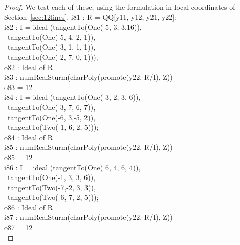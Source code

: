 \begin{proof}
We test each of these, using the formulation in local coordinates of
Section~\ref{sec:12lines}. 
%
\beginOutput
i81 : R = QQ[y11, y12, y21, y22];\\
\endOutput
%
\beginOutput
i82 : I = ideal (tangentTo(One( 5, 3, 3,16)), \\
\                 tangentTo(One( 5,-4, 2, 1)),  \\
\                 tangentTo(One(-3,-1, 1, 1)), \\
\                 tangentTo(One( 2,-7, 0, 1)));\\
\emptyLine
o82 : Ideal of R\\
\endOutput
%
\beginOutput
i83 : numRealSturm(charPoly(promote(y22, R/I), Z))\\
\emptyLine
o83 = 12\\
\endOutput
%
\beginOutput
i84 : I = ideal (tangentTo(One( 3,-2,-3, 6)), \\
\                 tangentTo(One(-3,-7,-6, 7)),  \\
\                 tangentTo(One(-6, 3,-5, 2)), \\
\                 tangentTo(Two( 1, 6,-2, 5)));\\
\emptyLine
o84 : Ideal of R\\
\endOutput
%
\beginOutput
i85 : numRealSturm(charPoly(promote(y22, R/I), Z))\\
\emptyLine
o85 = 12\\
\endOutput
%
\beginOutput
i86 : I = ideal (tangentTo(One( 6, 4, 6, 4)),  \\
\                 tangentTo(One(-1, 3, 3, 6)), \\
\                 tangentTo(Two(-7,-2, 3, 3)), \\
\                 tangentTo(Two(-6, 7,-2, 5)));\\
\emptyLine
o86 : Ideal of R\\
\endOutput
%
\beginOutput
i87 : numRealSturm(charPoly(promote(y22, R/I), Z))\\
\emptyLine
o87 = 12\\
\endOutput
%


\end{proof}
